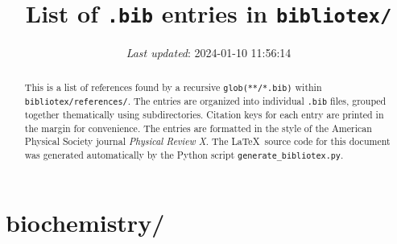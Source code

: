 \documentclass[letterpaper, 10pt, oneside, openany]{report}
\title{List of \texttt{.bib} entries in \texttt{bibliotex/}}
\date{\textit{Last updated}: 2024-01-10 11:56:14}
\begin{document}
\maketitle

\begin{abstract}
	This is a list of references found by a recursive \texttt{glob(**/*.bib)} within \texttt{bibliotex/references/}.
	The entries are organized into individual \texttt{.bib} files, grouped together thematically using subdirectories.
	Citation keys for each entry are printed in the margin for convenience.
	The entries are formatted in the style of the American Physical Society journal \emph{Physical Review X}.
	The \LaTeX\ source code for this document was generated automatically by the Python script \texttt{generate\_bibliotex.py}.
\end{abstract}

\tableofcontents

\chapter*{biochemistry/}

\begin{refsection}
	\nocite{*}
	\printbibliography[title = {Li-ATP.bib}, heading = subbibintoc]
\end{refsection}

\begin{refsection}
	\nocite{*}
	\printbibliography[title = {Mg-ATP.bib}, heading = subbibintoc]
\end{refsection}

\begin{refsection}
	\nocite{*}
	\printbibliography[title = {Mg-DNA.bib}, heading = subbibintoc]
\end{refsection}

\begin{refsection}
	\nocite{*}
	\printbibliography[title = {Mg-OAc.bib}, heading = subbibintoc]
\end{refsection}

\begin{refsection}
	\nocite{*}
	\printbibliography[title = {Mg.bib}, heading = subbibintoc]
\end{refsection}

\begin{refsection}
	\nocite{*}
	\printbibliography[title = {misc.bib}, heading = subbibintoc]
\end{refsection}
\end{document}
